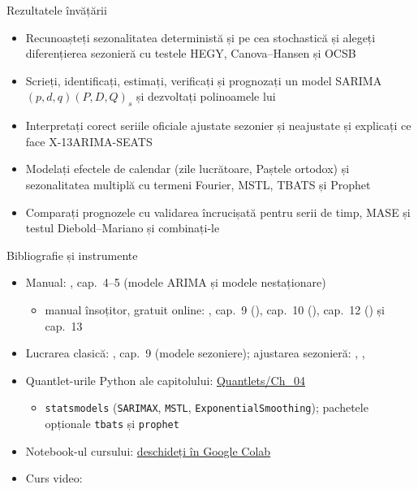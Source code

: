 \begin{frame}{Rezultatele învățării}
\itemsize{\small}
\begin{itemize}
    \item Recunoașteți sezonalitatea deterministă și pe cea stochastică și alegeți diferențierea sezonieră cu testele HEGY, Canova--Hansen și OCSB
    \item Scrieți, identificați, estimați, verificați și prognozați un model SARIMA$(p,d,q)(P,D,Q)_s$ și dezvoltați polinoamele lui
    \item Interpretați corect seriile oficiale ajustate sezonier și neajustate și explicați ce face X-13ARIMA-SEATS
    \item Modelați efectele de calendar (zile lucrătoare, Paștele ortodox) și sezonalitatea multiplă cu termeni Fourier, MSTL, TBATS și Prophet
    \item Comparați prognozele cu validarea încrucișată pentru serii de timp, MASE și testul Diebold--Mariano și combinați-le
\end{itemize}
\end{frame}

\begin{frame}{Bibliografie și instrumente}
\itemsize{\small}
\begin{itemize}
    \item Manual: , cap.~4--5 (modele ARIMA și modele nestaționare)
    \begin{itemize}
        \item manual însoțitor, gratuit online: , cap.~9 (), cap.~10 (), cap.~12 () și cap.~13
    \end{itemize}
    \item Lucrarea clasică: , cap.~9 (modele sezoniere); ajustarea sezonieră: , , 
    \item Quantlet-urile Python ale capitolului: \href{https://github.com/danpele/Time-Series-Analysis/tree/main/Quantlets/Ch_04}{Quantlets/Ch\_04}
    \begin{itemize}
        \item \texttt{statsmodels} (\texttt{SARIMAX}, \texttt{MSTL}, \texttt{ExponentialSmoothing}); pachetele opționale \texttt{tbats} și \texttt{prophet}
    \end{itemize}
    \item Notebook-ul cursului: \href{\colaburl{notebooks/EN/chapter4_lecture_notebook.ipynb}}{deschideți în Google Colab}
    \item Curs video: 
\end{itemize}
\end{frame}


